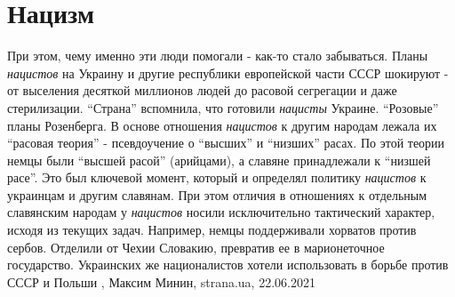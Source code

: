  
 
 
 
 
\chapter{Нацизм}

При этом, чему именно эти люди помогали - как-то стало забываться. Планы
\emph{нацистов} на Украину и другие республики европейской части СССР шокируют - от
выселения десяткой миллионов людей до расовой сегрегации и даже стерилизации.
\enquote{Страна} вспомнила, что готовили \emph{нацисты} Украине.  \enquote{Розовые}
планы Розенберга.  В основе отношения \emph{нацистов} к другим народам лежала их
\enquote{расовая теория} - псевдоучение о \enquote{высших} и \enquote{низших}
расах. По этой теории немцы были \enquote{высшей расой} (арийцами), а славяне
принадлежали к \enquote{низшей расе}.  Это был ключевой момент, который и
определял политику \emph{нацистов} к украинцам и другим славянам.  При этом отличия в
отношениях к отдельным славянским народам у \emph{нацистов} носили исключительно
тактический характер, исходя из текущих задач. Например, немцы поддерживали
хорватов против сербов. Отделили от Чехии Словакию, превратив ее в
марионеточное государство. Украинских же националистов хотели использовать в
борьбе против СССР и Польши
, 
Максим Минин, strana.ua, 22.06.2021

